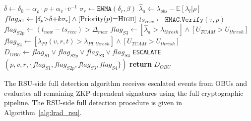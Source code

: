 \documentclass[12pt, a4paper]{report}
\begin{document}
\begin{algorithm}[H]
\caption{OBU Lightweight Rule-Based Detection
(\texttt{LRAD-OBU})}
\begin{algorithmic}[1]
\small
{}
  \State $\bar{\delta} \gets \delta_0
         +\alpha_\rho\cdot\rho
         +\alpha_v\cdot\bar{v}^{-1}$
         \hfill{}
  \State $\sigma_r \gets \texttt{EWMA}(\delta_r,\beta)$
         \hfill{}
  \State $\hat{\lambda}_a \gets \lambda_{obs}
         -\mathbb{E}[\lambda_l|\rho]$
         \hfill{}
  \State $flag_{S1} \gets
         [\delta_p{>}\bar{\delta}{+}k\sigma_r]
         \land[\text{Priority}(p){=}\textsc{High}]$
         \hfill{}
  \State $ts_{recv} \gets \texttt{HMAC.Verify}(\tau,p)$
         \hfill{}
  \State $flag_{S2p} \gets
         (t_{now}-ts_{recv})>\Delta_{max}$
         \hfill{}
  \State $flag_{S3} \gets
         [\hat{\lambda}_a>\lambda_{thresh}]
         \land[U_{TCAM}>U_{thresh}]$
         \hfill{}
  \State $flag_{S4} \gets
         [\lambda_{PI}(v,r,t)>\lambda_{PI,thresh}]
         \land[U_{TCAM}>U_{thresh}]$
         \hfill{}
  \State $D_{OBU} \gets flag_{S1}\lor flag_{S2p}
         \lor flag_{S3}\lor flag_{S4}$
    \State \texttt{ESCALATE}$(p,v,r,
           \{flag_{S1},flag_{S2p},
           flag_{S3},flag_{S4}\})$
           \hfill{}
  \EndIf
  \State \textbf{return} $D_{OBU}$
\EndProcedure
\end{algorithmic}
\label{alg:lrad_obu}
\end{algorithm}

The \ac{RSU}-side full detection algorithm receives escalated
events from \ac{OBU}s and evaluates all remaining
\ac{ZKP}-dependent signatures using the full cryptographic
pipeline. The \ac{RSU}-side full detection procedure is given
in Algorithm~\ref{alg:lrad_rsu}.
\end{document}

